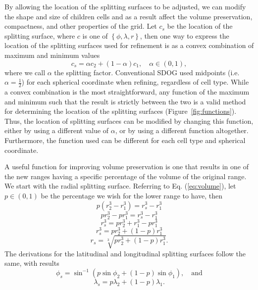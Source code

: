 By allowing the location of the splitting surfaces to be adjusted, we can modify the shape and size of children cells and as a result affect the volume preservation, compactness, and other properties of the grid.
Let $c_{s}$ be the location of the splitting surface, where $c$ is one of $\left\lbrace \phi, \lambda, r \right\rbrace$, then one way to express the location of the splitting surfaces used for refinement is as a convex combination of maximum and minimum values
%
\begin{equation} \label{eq:convex}
c_{s} = \alpha c_{2} + \left( 1-\alpha \right) c_{1}, \quad \alpha \in \left( 0, 1 \right),
\end{equation}
%
where we call $\alpha$ the splitting factor.
Conventional SDOG used midpoints (i.e.
$\alpha = \frac{1}{2}$) for each spherical coordinate when refining, regardless of cell type.
While a convex combination is the most straightforward, any function of the maximum and minimum such that the result is strictly between the two is a valid method for determining the location of the splitting surfaces (Figure~\ref{fig:functions}).
Thus, the location of splitting surfaces can be modified by changing this function, either by using a different value of $\alpha$, or by using a different function altogether.
Furthermore, the function used can be different for each cell type and spherical coordinate.


A useful function for improving volume preservation is one that results in one of the new ranges having a specific percentage of the volume of the original range.
We start with the radial splitting surface.
Referring to Eq.
(\ref{eq:volume}), let $p \in (0,1)$ be the percentage we wish for the lower range to have, then
%
\begin{equation*}
p \left( r_{2}^{3} - r_{1}^{3} \right) = r_{s}^{3} - r_{1}^{3}
\end{equation*}
%
\begin{equation*}
p r_{2}^{3} - p r_{1}^{3} = r_{s}^{3} - r_{1}^{3}
\end{equation*}
%
\begin{equation*}
r_{s}^{3} = p r_{2}^{3} + r_{1}^{3} - p r_{1}^{3}
\end{equation*}
%
\begin{equation*}
r_{s}^{3} = p r_{2}^{3} + \left( 1 - p \right) r_{1}^{3}
\end{equation*}
%
\begin{equation} \label{eq:radVol}
r_{s} = \sqrt[3]{ p r_{2}^{3} + \left( 1 - p \right) r_{1}^{3} }.
\end{equation}
%
The derivations for the latitudinal and longitudinal splitting surfaces follow the same, with results
%
\begin{equation} \label{eq:latVol}
\phi_{s} = \sin^{-1} \left( p \sin\phi_{2} + \left( 1 - p \right) \sin\phi_{1} \right), \quad\text{and}
\end{equation}
%
\begin{equation} \label{eq:longVol}
\lambda_{s} = p \lambda_{2} + \left( 1 - p \right) \lambda_{1}.
\end{equation}


